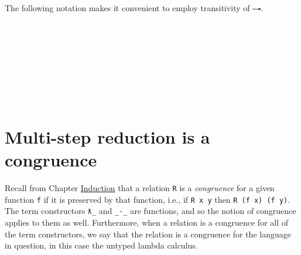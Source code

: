 The following notation makes it convenient to employ transitivity of
\texttt{—↠}.

\begin{fence}
\begin{code}%
\>[0]\AgdaSpace{}%
\AgdaSpace{}%
\<%
\\
%
\\[\AgdaEmptyExtraSkip]%
\>[0]\AgdaSpace{}%
\AgdaSymbol{:}\AgdaSpace{}%
\AgdaSpace{}%
\AgdaSymbol{\{}\AgdaSpace{}%
\AgdaSymbol{\}}\AgdaSpace{}%
\AgdaSymbol{(}\AgdaSpace{}%
\AgdaSymbol{:}\AgdaSpace{}%
\AgdaSpace{}%
\AgdaSpace{}%
\AgdaSymbol{)}\AgdaSpace{}%
\AgdaSymbol{\{}\AgdaSpace{}%
\AgdaSpace{}%
\AgdaSymbol{:}\AgdaSpace{}%
\AgdaSpace{}%
\AgdaSpace{}%
\AgdaSymbol{\}}\<%
\\
\>[0][@{}l@{\AgdaIndent{0}}]%
\>[4]\AgdaSpace{}%
\AgdaSpace{}%
\AgdaSpace{}%
\<%
\\
%
\>[4]%
\>[1645I]\AgdaSpace{}%
\AgdaSpace{}%
\<%
\\
\>[.][@{}l@{}]\<[1645I]%
\>[6]\AgdaComment{---------}\<%
\\
%
\>[4]\AgdaSpace{}%
\AgdaSpace{}%
\AgdaSpace{}%
\<%
\\
\>[0]\AgdaSpace{}%
\AgdaSpace{}%
\AgdaSpace{}%
\AgdaSpace{}%
\AgdaSpace{}%
\AgdaSymbol{=}\AgdaSpace{}%
\AgdaSpace{}%
\AgdaSpace{}%
\<%
\end{code}
\end{fence}

\hypertarget{multi-step-reduction-is-a-congruence}{%
\section{Multi-step reduction is a
congruence}\label{multi-step-reduction-is-a-congruence}}

Recall from Chapter \protect\hyperlink{Induction}{Induction} that a
relation \texttt{R} is a \emph{congruence} for a given function
\texttt{f} if it is preserved by that function, i.e., if
\texttt{R\ x\ y} then \texttt{R\ (f\ x)\ (f\ y)}. The term constructors
\texttt{ƛ\_} and \texttt{\_·\_} are functions, and so the notion of
congruence applies to them as well. Furthermore, when a relation is a
congruence for all of the term constructors, we say that the relation is
a congruence for the language in question, in this case the untyped
lambda calculus.

